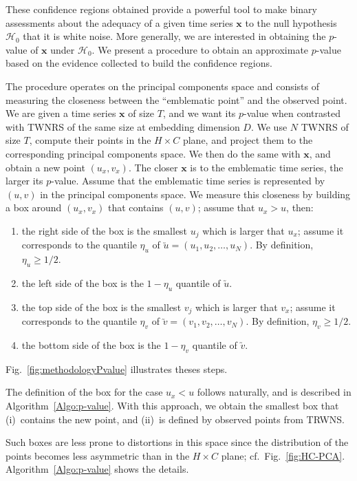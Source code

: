 These confidence regions obtained provide a powerful tool to make binary assessments about the adequacy of a given time series $\bm x$ to the null hypothesis $\mathcal H_0$ that it is white noise.
More generally, we are interested in obtaining the $p$-value of $\bm x$ under $\mathcal H_0$.
We present a procedure to obtain an approximate $p$-value based on the evidence collected to build the confidence regions.

The procedure operates on the principal components space and consists of measuring the closeness between the ``emblematic point'' and the observed point.
We are given a time series $\bm x$ of size $T$, and we want its $p$-value when contrasted with TWNRS of the same size at embedding dimension $D$.
We use $N$ TWNRS of size $T$, compute their points in the $H\times C$ plane, and project them to the corresponding principal components space.
We then do the same with $\bm x$, and obtain a new point $(u_x,v_x)$.
The closer $\bm x$ is to the emblematic time series, the larger its $p$-value.
Assume that the emblematic time series is represented by $(u,v)$ in the principal components space.
We measure this closeness by building a box around $(u_x,v_x)$ that contains $(u,v)$; assume that $u_x>u$, then:
\begin{enumerate}
	\item the right side of the box is the smallest $u_j$ which is larger that $u_x$; assume it corresponds to the quantile $\eta_u$ of $\utilde u = (u_1,u_2,\dots, u_N)$. By definition, $\eta_u\geq 1/2$.
	\item the left side of the box is the $1-\eta_u$ quantile of $\utilde u$.
	\item the top side of the box is the smallest $v_j$ which is larger that $v_x$; assume it corresponds to the quantile $\eta_v$ of $\utilde v = (v_1,v_2,\dots, v_N)$. By definition, $\eta_v\geq 1/2$.
	\item the bottom side of the box is the $1-\eta_v$ quantile of $\utilde v$.
\end{enumerate}
Fig.~\ref{fig:methodologyPvalue} illustrates theses steps.

The definition of the box for the case $u_x<u$ follows naturally, and is described in Algorithm~\ref{Algo:p-value}.
With this approach, we obtain the smallest box that (i)~contains the new point, and (ii)~is defined by observed points from TRWNS.

Such boxes are less prone to distortions in this space since the distribution of the points becomes less asymmetric than in the $H\times C$ plane; cf.\ Fig.~\ref{fig:HC-PCA}.
Algorithm~\ref{Algo:p-value} shows the details.

